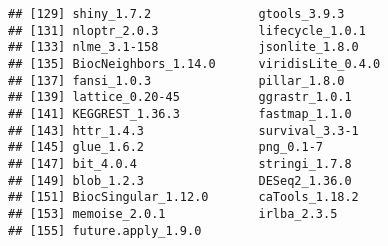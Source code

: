 \documentclass[
  openany]{book}
\begin{document}
\begin{verbatim}
## [129] shiny_1.7.2               gtools_3.9.3             
## [131] nloptr_2.0.3              lifecycle_1.0.1          
## [133] nlme_3.1-158              jsonlite_1.8.0           
## [135] BiocNeighbors_1.14.0      viridisLite_0.4.0        
## [137] fansi_1.0.3               pillar_1.8.0             
## [139] lattice_0.20-45           ggrastr_1.0.1            
## [141] KEGGREST_1.36.3           fastmap_1.1.0            
## [143] httr_1.4.3                survival_3.3-1           
## [145] glue_1.6.2                png_0.1-7                
## [147] bit_4.0.4                 stringi_1.7.8            
## [149] blob_1.2.3                DESeq2_1.36.0            
## [151] BiocSingular_1.12.0       caTools_1.18.2           
## [153] memoise_2.0.1             irlba_2.3.5              
## [155] future.apply_1.9.0
\end{verbatim}

\vspace{-100pt}

  
\end{document}
